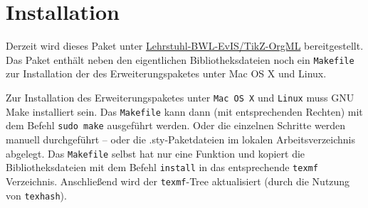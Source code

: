 \section{Installation}
\label{sec:Installation}
Derzeit wird dieses Paket unter \href{https://github.com/Lehrstuhl-BWL-EvIS/TikZ-OrgML}{Lehrstuhl-BWL-EvIS/TikZ-OrgML} bereitgestellt. Das Paket enthält neben den eigentlichen Bibliotheksdateien noch ein \texttt{Makefile} zur Installation der des Erweiterungspaketes unter \textsf{Mac OS X} und \textsf{Linux}.\medskip

\noindent Zur Installation des Erweiterungspaketes unter \texttt{Mac OS X} und \texttt{Linux} muss \textsf{GNU Make} installiert sein.
Das \texttt{Makefile} kann dann (mit entsprechenden Rechten) mit dem Befehl \verb!sudo make! ausgeführt werden.
Oder die einzelnen Schritte werden manuell durchgeführt -- oder die .sty-Paketdateien im lokalen Arbeitsverzeichnis abgelegt.
%
Das \texttt{Makefile} selbst hat nur eine Funktion und kopiert die Bibliotheksdateien mit dem Befehl \texttt{install} in das entsprechende \texttt{texmf} Verzeichnis. Anschließend wird der \texttt{texmf}-Tree aktualisiert (durch die Nutzung von \texttt{texhash}).

